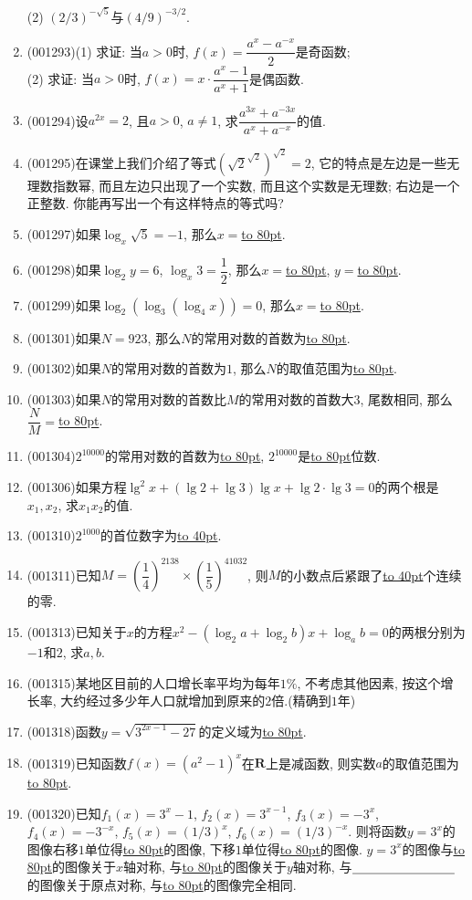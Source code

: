 \documentclass[10pt,a4paper]{article}
\newcommand{\blank}[1]{\underline{\hbox to #1pt{}}}
\begin{document}
\begin{enumerate}[1.]
(2) $(2/3)^{-\sqrt{5}}$与$(4/9)^{-3/2}$.
\item {\tiny (001293)}(1) 求证: 当$a>0$时, $f(x)=\dfrac{a^x-a^{-x}}{2}$是奇函数;\\ 
(2) 求证: 当$a>0$时, $f(x)=x\cdot \dfrac{a^x-1}{a^x+1}$是偶函数.
\item {\tiny (001294)}设$a^{2x}=2$, 且$a>0$, $a \ne 1$, 求$\dfrac{a^{3x}+a^{-3x}}{a^x+a^{-x}}$的值.
\item {\tiny (001295)}在课堂上我们介绍了等式$\left(\sqrt{2}^{\sqrt{2}}\right)^{\sqrt{2}}=2$, 它的特点是左边是一些无理数指数幂, 而且左边只出现了一个实数, 而且这个实数是无理数; 右边是一个正整数. 你能再写出一个有这样特点的等式吗?
\item {\tiny (001297)}如果$\log_x\sqrt{5}=-1$, 那么$x=$\blank{80}.
\item {\tiny (001298)}如果$\log_2 y=6$, $\log_x 3=\dfrac{1}{2}$, 那么$x=$\blank{80}, $y=$\blank{80}.
\item {\tiny (001299)}如果$\log_2(\log_3(\log_4x))=0$, 那么$x=$\blank{80}.
\item {\tiny (001301)}如果$N=923$, 那么$N$的常用对数的首数为\blank{80}.
\item {\tiny (001302)}如果$N$的常用对数的首数为$1$, 那么$N$的取值范围为\blank{80}.
\item {\tiny (001303)}如果$N$的常用对数的首数比$M$的常用对数的首数大$3$, 尾数相同, 那么$\dfrac{N}{M}=$\blank{80}.
\item {\tiny (001304)}$2^{10000}$的常用对数的首数为\blank{80}, $2^{10000}$是\blank{80}位数.
\item {\tiny (001306)}如果方程$\lg^2x+(\lg2+\lg3)\lg x+\lg2\cdot\lg3=0$的两个根是$x_1,x_2$, 求$x_1x_2$的值.
\item {\tiny (001310)}$2^{1000}$的首位数字为\blank{40}.
\item {\tiny (001311)}已知$M=(\dfrac{1}{4})^{2138}\times(\dfrac{1}{5})^{41032}$, 则$M$的小数点后紧跟了\blank{40}个连续的零.
\item {\tiny (001313)}已知关于$x$的方程$x^2-(\log_2 a+\log_2 b)x+\log_a b=0$的两根分别为$-1$和$2$, 求$a,b$.
\item {\tiny (001315)}某地区目前的人口增长率平均为每年$1\%$, 不考虑其他因素, 按这个增长率, 大约经过多少年人口就增加到原来的$2$倍.(精确到$1$年)
\item {\tiny (001318)}函数$y=\sqrt{3^{2x-1}-27}$的定义域为\blank{80}.
\item {\tiny (001319)}已知函数$f(x)=(a^2-1)^x$在$\mathbf{R}$上是减函数, 则实数$a$的取值范围为\blank{80}.
\item {\tiny (001320)}已知$f_1(x)=3^x-1$, $f_2(x)=3^{x-1}$, $f_3(x)=-3^x$, $f_4(x)=-3^{-x}$, $f_5(x)=(1/3)^x$, $f_6(x)=(1/3)^{-x}$. 则将函数$y=3^x$的图像右移$1$单位得\blank{80}的图像, 下移$1$单位得\blank{80}的图像. $y=3^x$的图像与\blank{80}的图像关于$x$轴对称, 与\blank{80}的图像关于$y$轴对称, 与$\blank{80}$的图像关于原点对称, 与\blank{80}的图像完全相同.

\end{enumerate}
\end{document}
